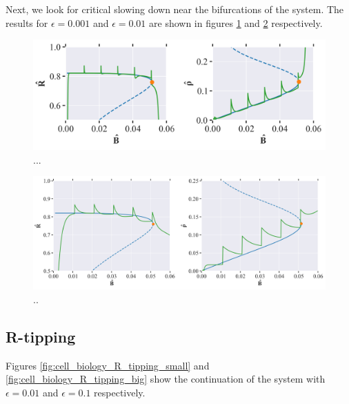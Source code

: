 Next, we look for critical slowing down near the bifurcations of the system. The results for $\epsilon = 0.001$ and $\epsilon = 0.01$ are shown in figures \ref{fig:cell_biology_critical_slowing_down_small} and \ref{fig:cell_biology_critical_slowing_down_big} respectively.
\begin{figure}[H]
    \centering
    \includegraphics[width= \textwidth]{figures/cb_critslow_R(0)=0.0_rho(0)=0.0_B(0)_0.001_eps=0.001_Bmax=0.04.png}
    \caption{...}
    \label{fig:cell_biology_critical_slowing_down_small}
\end{figure}

\begin{figure}[H]
    \centering
    \includegraphics[width= \textwidth]{figures/cb_critslow_R(0)=0.0_rho(0)=0.0_B(0)_0.001_eps=0.01_Bmax=0.04.png}
    \caption{..}
    \label{fig:cell_biology_critical_slowing_down_big}
\end{figure}

\subsection{R-tipping}
Figures \ref{fig:cell_biology_R_tipping_small} and \ref{fig:cell_biology_R_tipping_big} show the continuation of the system with $\epsilon = 0.01$ and $\epsilon = 0.1$ respectively.

